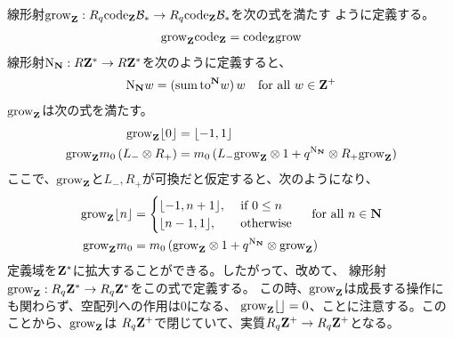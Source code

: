{	線形射$\grow_\sei:R_q\code_\sei\clB_*\to R_q\code_\sei\clB_*$を次の式を満たす
	ように定義する。
	\begin{equation*}\begin{split}
		\grow_\sei\code_\sei = \code_\sei\grow
	\end{split}\end{equation*}
	線形射$\opN_\sizen:R\sei^*\to R\sei^*$を次のように定義すると、
	\begin{equation*}\begin{split}
		\opN_\sizen w = \plr{\sumw\,\toN w} w \quad\text{for all } w\in\sei^+
	\end{split}\end{equation*}
	$\grow_\sei$は次の式を満たす。
	\begin{equation*}\begin{split}
		\grow_\sei\word{0} &= \word{-1, 1} \\
		\grow_\sei m_0\plr{L_-\otimes R_+} 
		&= m_0\plr{L_-\grow_\sei\otimes1 + q^{\opN_\sizen}\otimes R_+\grow_\sei} \\
	\end{split}\end{equation*}
	ここで、$\grow_\sei$と$L_-,R_+$が可換だと仮定すると、次のようになり、
	\begin{equation*}\begin{split}
		\grow_\sei\word{n} &= \begin{cases}
			\word{-1, n+1}, &\text{ if } 0\le n \\
			\word{n - 1, 1}, &\text{ otherwise } \\
		\end{cases} \quad\text{for all } n\in\sizen \\
		\grow_\sei m_0 
		&= m_0\plr{\grow_\sei\otimes1 + q^{\opN_\sizen}\otimes\grow_\sei}
	\end{split}\end{equation*}
	定義域を$\sei^*$に拡大することができる。したがって、改めて、
	線形射$\grow_\sei:R_q\sei^*\to R_q\sei^*$をこの式で定義する。
	この時、$\grow_\sei$は成長する操作にも関わらず、空配列への作用は$0$になる、
	$\grow_\sei\word{}=0$、ことに注意する。このことから、$\grow_\sei$は
	$R_q\sei^+$で閉じていて、実質$R_q\sei^+\to R_q\sei^+$となる。

}
